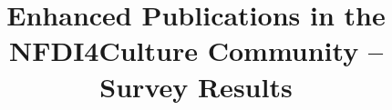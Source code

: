 \documentclass[11pt]{book}
\title{Enhanced Publications in the NFDI4Culture Community – Survey Results}
\author{}
\begin{document}
\maketitle
\def\title#1{\chapter{#1}}
\tableofcontents

        
        
\end{document}
